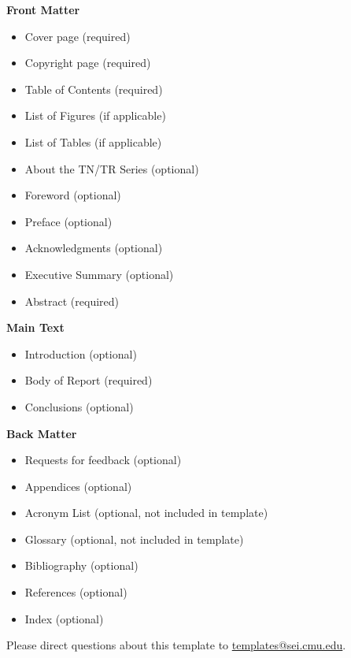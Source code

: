 \begin{executivesummary}
\textcolor{seiblue}{\bf\large Front Matter}
\begin{itemize}
\item Cover page (required)
\item Copyright page (required)
\item Table of Contents (required)
\item List of Figures (if applicable)
\item List of Tables (if applicable)
\item About the TN/TR Series (optional)
\item Foreword (optional)
\item Preface (optional)
\item Acknowledgments (optional)
\item Executive Summary (optional)
\item Abstract (required)
\end{itemize}
\textcolor{seiblue}{\bf\large Main Text}
\begin{itemize}
\item Introduction (optional)
\item Body of Report (required)
\item Conclusions (optional)
\end{itemize}
\textcolor{seiblue}{\bf\large Back Matter}
\begin{itemize}
\item Requests for feedback (optional)
\item Appendices (optional)
\item Acronym List (optional, not included in template)
\item Glossary (optional, not included in template)
\item Bibliography (optional)
\item References (optional)
\item Index (optional)
\end{itemize}

Please direct questions about this template to \href{mailto:templates@sei.cmu.edu}{templates@sei.cmu.edu}.
\end{executivesummary}